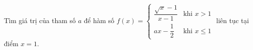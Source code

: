 \begin{ex}
Tìm giá trị của tham số $a$ để hàm số $f(x)=\begin{cases}\dfrac{\sqrt x-1}{x-1}&\text{khi }x>1\\ax-\dfrac12&\text{khi }x\le1\end{cases}$ liên tục tại điểm $x=1$.
\end{ex}
